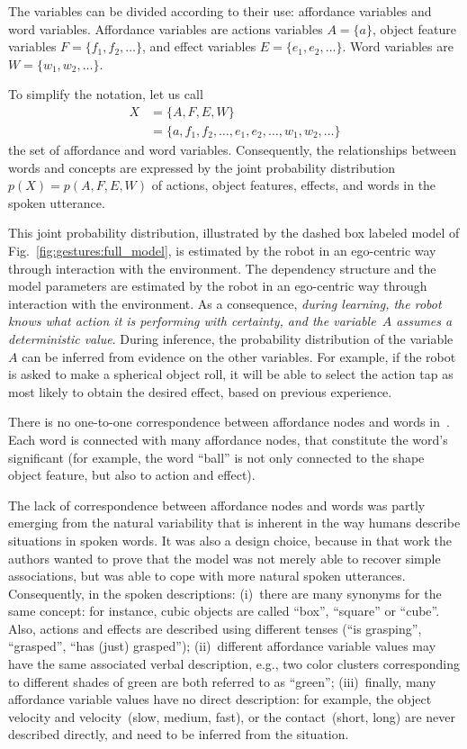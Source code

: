 The variables can be divided according to their use: affordance variables and word variables.
Affordance variables are actions variables $A = \{a\}$, object feature variables $F=\{f_1, f_2, \dots\}$, and effect variables $E=\{e_1, e_2, \dots\}$.
Word variables are $W = \{w_1, w_2, \dots\}$.

To simplify the notation, let us call
\begin{align*}
X &= \{A, F, E, W\} \\
  &= \{a, f_1, f_2, \dots, e_1, e_2, \dots, w_1, w_2, \dots\}
\end{align*}
the set of affordance and word variables.
Consequently, the relationships between words and concepts are expressed by the joint probability distribution~$p(X) = p(A, F, E, W)$ of actions, object features, effects, and words in the spoken utterance.

This joint probability distribution,
illustrated by the dashed box labeled \AffWords{} model of Fig.~\ref{fig:gestures:full_model},
is estimated by the robot in an ego-centric way through interaction with the environment.
The dependency structure and the model parameters are estimated by the robot in an ego-centric way through interaction with the environment.
As a consequence, \emph{during learning, the robot knows \apriori{} what action it is performing with certainty, and the variable~$A$ assumes a deterministic value}.
During inference, the probability distribution of the variable~$A$ can be inferred from evidence on the other variables.
For example, if the robot is asked to make a spherical object roll, it will be able to select the action tap as most likely to obtain the desired effect, based on previous experience.

There is no one-to-one correspondence between affordance nodes and words in~\cite{salvi:2012:smcb}.
Each word is connected with many affordance nodes, that constitute the word's significant (for example, the word ``ball'' is not only connected to the shape object feature, but also to action and effect).

The lack of correspondence between affordance nodes and words was partly emerging from the natural variability that is inherent in the way humans describe situations in spoken words.
It was also a design choice, because in that work the authors wanted to prove that the model was not merely able to recover simple \wordmeaning{} associations, but was able to cope with more natural spoken utterances.
Consequently, in the spoken descriptions:
(i)~there are many synonyms for the same concept: for instance, cubic objects are called ``box'', ``square'' or ``cube''. Also, actions and effects are described using different tenses (``is grasping'', ``grasped'', ``has (just) grasped'');
(ii)~different affordance variable values may have the same associated verbal description, e.g., two color clusters corresponding to different shades of green are both referred to as ``green'';
(iii)~finally, many affordance variable values have no direct description: for example, the object velocity and \objecthand{} velocity~(slow, medium, fast), or the \objecthand{} contact~(short, long) are never described directly, and need to be inferred from the situation.

